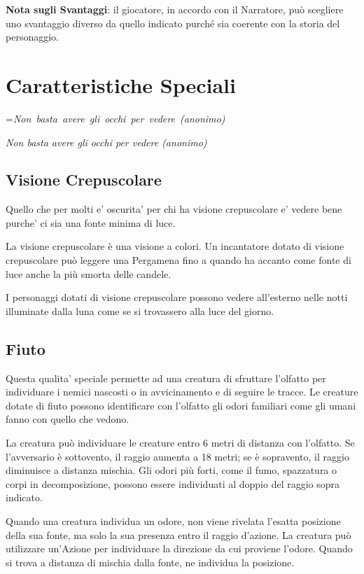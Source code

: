 \documentclass[a4paper,11pt,twoside,openany]{book}
\makeatletter
\newcommand{\mybox}[1]{%
	\setbox0=\hbox{#1}%
	\setlength{\@tempdima}{\dimexpr\wd0+13pt}%
	\begin{tcolorbox}[boxrule=0.5pt,arc=4pt, breakable,enhanced,
		left=6pt,right=6pt,top=6pt,bottom=6pt,boxsep=0pt,width=\@tempdima]
		#1
	\end{tcolorbox}
}
\makeatother
\begin{document}
\bigskip

\textbf{Nota sugli Svantaggi}: il giocatore, in accordo con il Narratore, può scegliere uno svantaggio diverso da quello indicato purché sia coerente con la storia del personaggio.


\pagebreak

\section{Caratteristiche Speciali}

\label{caratteristiche-speciali}
\mybox{\textit{Non basta avere gli occhi per vedere (anonimo)}}\medskip


\subsection{Visione Crepuscolare}

Quello che per molti e’ oscurita’ per chi ha visione crepuscolare e’ vedere bene purche’ ci sia una fonte minima di luce.

La visione crepuscolare è una visione a colori.
Un incantatore dotato di visione crepuscolare può leggere una Pergamena fino a quando ha accanto come fonte di luce anche la più smorta delle candele.

I personaggi dotati di visione crepuscolare possono vedere all’esterno nelle notti illuminate dalla luna come se si trovassero alla luce del giorno.

\subsection{Fiuto}

Questa qualita’ speciale permette ad una creatura di sfruttare l'olfatto per individuare i nemici nascosti o in avvicinamento e di seguire le tracce. Le creature dotate di fiuto possono identificare con l'olfatto gli odori familiari come gli umani fanno con quello che vedono.

La creatura può individuare le creature entro 6 metri di distanza con l'olfatto. Se l'avversario è sottovento, il raggio aumenta a 18 metri; se è sopravento, il raggio diminuisce a distanza mischia.
Gli odori più forti, come il fumo, spazzatura o corpi in decomposizione, possono essere individuati al doppio del raggio sopra indicato.

Quando una creatura individua un odore, non viene rivelata l'esatta posizione della sua fonte, ma solo la sua presenza entro il raggio d'azione. La creatura può utilizzare un'Azione per individuare la direzione da cui proviene l'odore. Quando si trova a distanza di mischia dalla fonte, ne individua la posizione.
\end{document}
